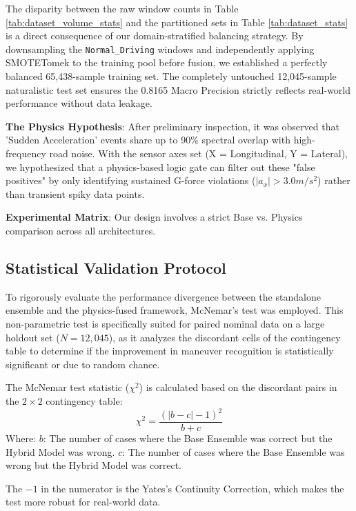 \documentclass[pdflatex,sn-mathphys-num]{sn-jnl}
\theoremstyle{thmstyleone}
\theoremstyle{thmstyletwo}
\theoremstyle{thmstylethree}
\begin{document}
The disparity between the raw window counts in Table \ref{tab:dataset_volume_stats} and the partitioned sets in Table \ref{tab:dataset_stats} is a direct consequence of our domain-stratified balancing strategy. By downsampling the \texttt{Normal\_Driving} windows and independently applying SMOTETomek to the training pool before fusion, we established a perfectly balanced 65,438-sample training set. The completely untouched 12,045-sample naturalistic test set ensures the 0.8165 Macro Precision strictly reflects real-world performance without data leakage.

\textbf{The Physics Hypothesis}: After preliminary inspection, it was observed that 'Sudden Acceleration' events share up to 90\% spectral overlap with high-frequency road noise. With the sensor axes set (X = Longitudinal, Y = Lateral), we hypothesized that a physics-based logic gate can filter out these "false positives" by only identifying sustained G-force violations ($|a_x|>3.0m/s^2$) rather than transient spiky data points.

\textbf{Experimental Matrix}: Our design involves a strict Base vs. Physics comparison across all architectures.





\FloatBarrier
\subsection{Statistical Validation Protocol}
To rigorously evaluate the performance divergence between the standalone ensemble and the physics-fused framework, McNemar's test was employed. This non-parametric test is specifically suited for paired nominal data on a large holdout set ($N=12,045$), as it analyzes the discordant cells of the contingency table to determine if the improvement in maneuver recognition is statistically significant or due to random chance. 

The McNemar test statistic ($\chi^2$) is calculated based on the discordant pairs in the $2 \times 2$ contingency table:
$$\chi^2 = \frac{(|b - c| - 1)^2}{b + c}$$
Where:
$b$: The number of cases where the Base Ensemble was correct but the Hybrid Model was wrong.
$c$: The number of cases where the Base Ensemble was wrong but the Hybrid Model was correct.

The $-1$ in the numerator is the Yates's Continuity Correction, which makes the test more robust for real-world data.
\FloatBarrier
\end{document}
